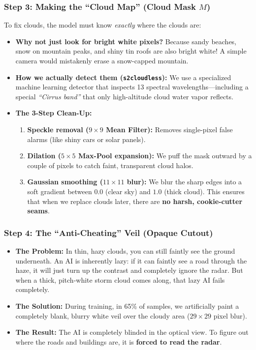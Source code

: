 \documentclass[11pt,a4paper]{article}
\begin{document}
\subsubsection*{Step 3: Making the ``Cloud Map'' (Cloud Mask $M$)}
To fix clouds, the model must know \textit{exactly} where the clouds are:
\begin{itemize}[leftmargin=1.5em]
    \item \textbf{Why not just look for bright white pixels?} Because sandy beaches, snow on mountain peaks, and shiny tin roofs are also bright white! A simple camera would mistakenly erase a snow-capped mountain.
    \item \textbf{How we actually detect them (\texttt{s2cloudless}):} We use a specialized machine learning detector that inspects 13 spectral wavelengths---including a special \textit{``Cirrus band''} that only high-altitude cloud water vapor reflects.
    \item \textbf{The 3-Step Clean-Up:}
    \begin{enumerate}
        \item \textbf{Speckle removal ($9\times 9$ Mean Filter):} Removes single-pixel false alarms (like shiny cars or solar panels).
        \item \textbf{Dilation ($5\times 5$ Max-Pool expansion):} We puff the mask outward by a couple of pixels to catch faint, transparent cloud halos.
        \item \textbf{Gaussian smoothing ($11\times 11$ blur):} We blur the sharp edges into a soft gradient between $0.0$ (clear sky) and $1.0$ (thick cloud). This ensures that when we replace clouds later, there are \textbf{no harsh, cookie-cutter seams}.
    \end{enumerate}
\end{itemize}

\subsubsection*{Step 4: The ``Anti-Cheating'' Veil (Opaque Cutout)}
\begin{itemize}[leftmargin=1.5em]
    \item \textbf{The Problem:} In thin, hazy clouds, you can still faintly see the ground underneath. An AI is inherently lazy: if it can faintly see a road through the haze, it will just turn up the contrast and completely ignore the radar. But when a thick, pitch-white storm cloud comes along, that lazy AI fails completely.
    \item \textbf{The Solution:} During training, in 65\% of samples, we artificially paint a completely blank, blurry white veil over the cloudy area ($29\times 29$ pixel blur).
    \item \textbf{The Result:} The AI is completely blinded in the optical view. To figure out where the roads and buildings are, it is \textbf{forced to read the radar}.
\end{itemize}
\end{document}
